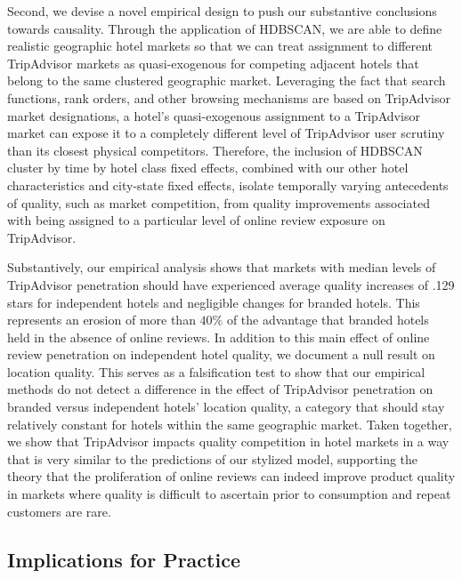 \documentclass{informs_mod} %
\begin{document}
Second, we devise a novel empirical design to push our substantive conclusions towards causality. Through the application of HDBSCAN, we are able to define realistic geographic hotel markets so that we can treat assignment to different TripAdvisor markets as quasi-exogenous for competing adjacent hotels that belong to the same clustered geographic market. Leveraging the fact that search functions, rank orders, and other browsing mechanisms are based on TripAdvisor market designations, a hotel's quasi-exogenous assignment to a TripAdvisor market can expose it to a completely different level of TripAdvisor user scrutiny than its closest physical competitors. Therefore, the inclusion of HDBSCAN cluster by time by hotel class fixed effects, combined with our other hotel characteristics and city-state fixed effects, isolate temporally varying antecedents of quality, such as market competition, from quality improvements associated with being assigned to a particular level of online review exposure on TripAdvisor.

Substantively, our empirical analysis shows that markets with median levels of TripAdvisor penetration should have experienced average quality increases of .129 stars for independent hotels and negligible changes for branded hotels. This represents an erosion of more than $40\%$ of the advantage that branded hotels held in the absence of online reviews. In addition to this main effect of online review penetration on independent hotel quality, we document a null result on location quality. This serves as a falsification test to show that our empirical methods do not detect a difference in the effect of TripAdvisor penetration on branded versus independent hotels' location quality, a category that should stay relatively constant for hotels within the same geographic market. Taken together, we show that TripAdvisor impacts quality competition in hotel markets in a way that is very similar to the predictions of our stylized model, supporting the theory that the proliferation of online reviews can indeed improve product quality in markets where quality is difficult to ascertain prior to consumption and repeat customers are rare. 

\subsection{Implications for Practice}
\end{document}

